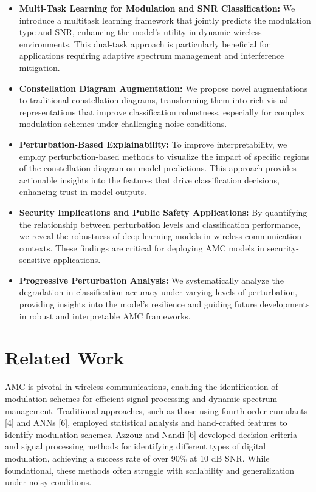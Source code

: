 \documentclass{ELSP}
\begin{document}
\begin{itemize}
    \item \textbf{Multi-Task Learning for Modulation and SNR Classification:} We introduce a multitask learning framework that jointly predicts the modulation type and SNR, enhancing the model's utility in dynamic wireless environments. This dual-task approach is particularly beneficial for applications requiring adaptive spectrum management and interference mitigation.
    
    \item \textbf{Constellation Diagram Augmentation:} We propose novel augmentations to traditional constellation diagrams, transforming them into rich visual representations that improve classification robustness, especially for complex modulation schemes under challenging noise conditions.
    
    \item \textbf{Perturbation-Based Explainability:} To improve interpretability, we employ perturbation-based methods to visualize the impact of specific regions of the constellation diagram on model predictions. This approach provides actionable insights into the features that drive classification decisions, enhancing trust in model outputs.
    
    \item \textbf{Security Implications and Public Safety Applications:} By quantifying the relationship between perturbation levels and classification performance, we reveal the robustness of deep learning models in wireless communication contexts. These findings are critical for deploying AMC models in security-sensitive applications.
    
    \item \textbf{Progressive Perturbation Analysis:} We systematically analyze the degradation in classification accuracy under varying levels of perturbation, providing insights into the model's resilience and guiding future developments in robust and interpretable AMC frameworks.
\end{itemize}

\section{Related Work}
AMC is pivotal in wireless communications, enabling the identification of modulation schemes for efficient signal processing and dynamic spectrum management. Traditional approaches, such as those using fourth-order cumulants [4] and ANNs [6], employed statistical analysis and hand-crafted features to identify modulation schemes. Azzouz and Nandi [6] developed decision criteria and signal processing methods for identifying different types of digital modulation, achieving a success rate of over 90\% at 10 dB SNR. While foundational, these methods often struggle with scalability and generalization under noisy conditions.
\end{document}
